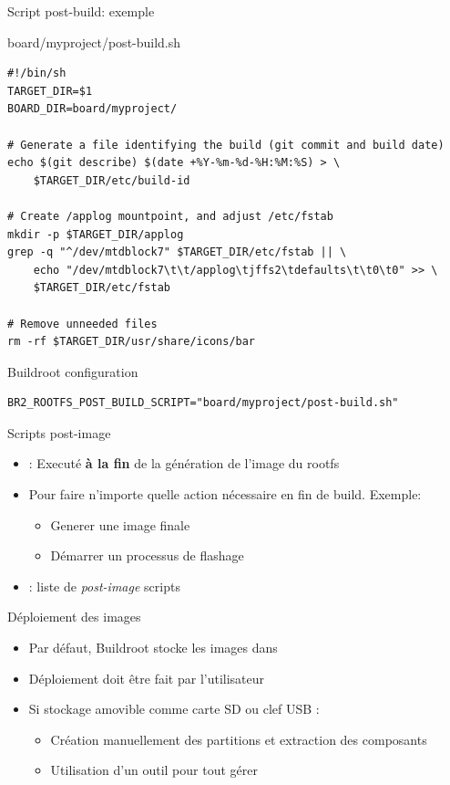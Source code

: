\documentclass[aspectratio=169,obeyspaces,spaces,hyphens,dvipsnames]{beamer}
\begin{document}
\begin{frame}[fragile]{Script post-build: exemple}

\begin{block}{board/myproject/post-build.sh}
\begin{verbatim}
#!/bin/sh
TARGET_DIR=$1
BOARD_DIR=board/myproject/

# Generate a file identifying the build (git commit and build date)
echo $(git describe) $(date +%Y-%m-%d-%H:%M:%S) > \
    $TARGET_DIR/etc/build-id

# Create /applog mountpoint, and adjust /etc/fstab
mkdir -p $TARGET_DIR/applog
grep -q "^/dev/mtdblock7" $TARGET_DIR/etc/fstab || \
    echo "/dev/mtdblock7\t\t/applog\tjffs2\tdefaults\t\t0\t0" >> \
    $TARGET_DIR/etc/fstab

# Remove unneeded files
rm -rf $TARGET_DIR/usr/share/icons/bar
\end{verbatim}
\end{block}

\begin{block}{Buildroot configuration}
{\scriptsize
\begin{verbatim}
BR2_ROOTFS_POST_BUILD_SCRIPT="board/myproject/post-build.sh"
\end{verbatim}}
\end{block}

\end{frame}

\begin{frame}{Scripts post-image}
  \begin{itemize}
  \item {} : Executé \textbf{à la fin} de la génération
    de l'image du rootfs
  \item Pour faire n'importe quelle action nécessaire en fin de build. Exemple:
    \begin{itemize}
    \item Generer une image finale
    \item Démarrer un processus de flashage
    \end{itemize}
  \item {} : liste de {\em post-image} scripts
  \end{itemize}
\end{frame}

\begin{frame}{Déploiement des images}
  \begin{itemize}
  \item Par défaut, Buildroot stocke les images dans 
  \item Déploiement doit être fait par l'utilisateur
  \item Si stockage amovible comme carte SD ou clef USB :
    \begin{itemize}
    \item Création manuellement des partitions et extraction des composants
    \item Utilisation d'un outil  pour tout gérer
    \end{itemize}
  \end{itemize}
\end{frame}
\end{document}
